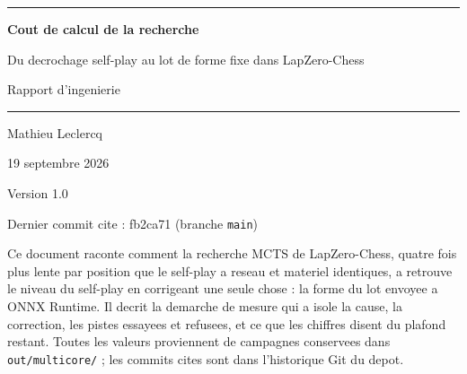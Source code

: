 \documentclass[11pt,a4paper]{article}
\newcommand{\code}[1]{\texttt{\small #1}}
\newcommand{\docTitre}{Cout de calcul de la recherche}
\newcommand{\docSousTitre}{Du decrochage self-play au lot de forme fixe
dans LapZero-Chess}
\newcommand{\docAuteur}{Mathieu Leclercq}
\newcommand{\docDate}{19 septembre 2026}
\newcommand{\docVersion}{Version 1.0}
\newcommand{\docCommit}{fb2ca71 (branche \code{main})}
\begin{document}
\begin{titlepage}
\centering
\vspace*{1.5cm}
{\color{bleu}\rule{\textwidth}{1.2pt}}
\vspace{0.8cm}

{\Huge\bfseries\color{bleu} \docTitre\par}
\vspace{0.5cm}
{\Large\color{gris} \docSousTitre\par}

\vspace{0.6cm}
{\large Rapport d'ingenierie\par}

\vspace{0.4cm}
{\color{bleu}\rule{\textwidth}{0.6pt}}
\vspace{1.2cm}

{\large \docAuteur\par}
{\large \docDate\par}
\vspace{0.3cm}
{\small \docVersion\par}
{\small Dernier commit cite : \docCommit\par}

\vfill

\begin{tcolorbox}[enhanced, colback=grisfond, colframe=gris!50,
  boxrule=0.5pt, arc=2pt, width=0.88\textwidth]
\small
Ce document raconte comment la recherche MCTS de LapZero-Chess, quatre fois
plus lente par position que le self-play a reseau et materiel identiques, a
retrouve le niveau du self-play en corrigeant une seule chose : la forme du
lot envoyee a ONNX Runtime. Il decrit la demarche de mesure qui a isole la
cause, la correction, les pistes essayees et refusees, et ce que les chiffres
disent du plafond restant. Toutes les valeurs proviennent de campagnes
conservees dans \code{out/multicore/} ; les commits cites sont dans
l'historique Git du depot.
\end{tcolorbox}
\vspace{1cm}
\end{titlepage}

\tableofcontents
\newpage










\end{document}
